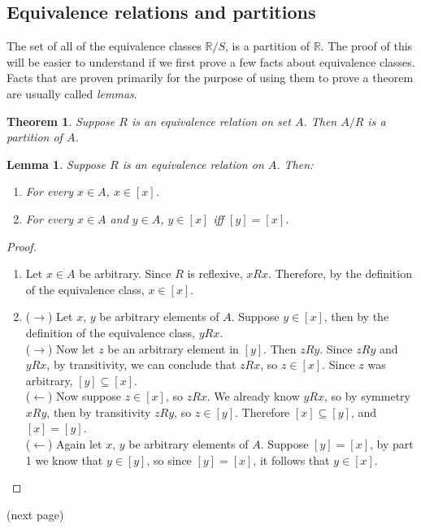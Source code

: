\documentclass{report}
\newtheorem*{theorem}{Theorem}
\newtheorem*{lemma}{Lemma}
\theoremstyle{definition}
\begin{document}
\subsection{Equivalence relations and partitions}
The set of all of the equivalence classes $\mathbb R/S$, is a partition of $\mathbb R$.
The proof of this will be easier to understand if we first prove a few facts about equivalence classes. Facts that are proven primarily for the purpose of using them to prove a theorem are usually
called \textit{lemmas}.
\begin{theorem}
Suppose $R$ is an equivalence relation on set $A$. Then $A/R$ is a partition of $A$.
\end{theorem}
\begin{lemma}
Suppose $R$ is an equivalence relation on $A$. Then:
\begin{enumerate}
\item For every $x\in A$, $x\in[x]$.
\item For every $x\in A$ and $y\in A$, $y\in[x]$ iff $[y]=[x]$.
\end{enumerate}
\end{lemma}
\begin{proof}\hspace{1mm}
\begin{enumerate}
\item Let $x\in A$ be arbitrary. Since $R$ is reflexive, $xRx$. Therefore, by the definition of the equivalence class, $x\in[x]$.
\item ($\rightarrow$) Let $x$, $y$ be arbitrary elements of $A$. Suppose $y\in[x]$, then by the definition of the equivalence class, $yRx$.\\
($\rightarrow$) Now let $z$ be an arbitrary element in $[y]$. Then $zRy$. Since $zRy$ and $yRx$, by transitivity, we can conclude that $zRx$, so $z\in[x]$. Since $z$ was arbitrary, 
$[y]\subseteq[x]$.\\
($\leftarrow$) Now suppose $z\in[x]$, so $zRx$. We already know $yRx$, so by symmetry $xRy$, then by transitivity $zRy$, so $z\in[y]$. Therefore $[x]\subseteq[y]$, and $[x]=[y]$.\\
($\leftarrow$) Again let $x$, $y$ be arbitrary elements of $A$. Suppose $[y]=[x]$, by part 1 we know that $y\in[y]$, so since $[y]=[x]$, it follows that $y\in[x]$.\qedhere
\end{enumerate}
\end{proof}
\noindent(next page)\newpage
\end{document}
